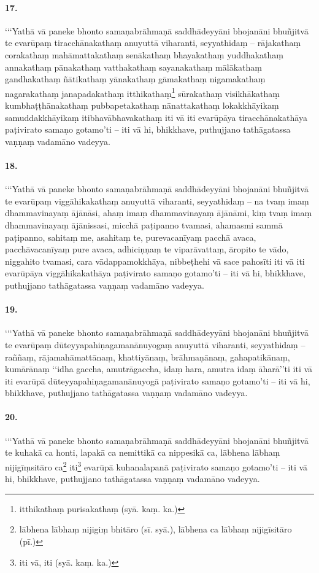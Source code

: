 \paragraph{17.}
‘‘‘Yathā vā paneke bhonto samaṇabrāhmaṇā saddhādeyyāni bhojanāni bhuñjitvā te evarūpaṃ tiracchānakathaṃ anuyuttā viharanti, seyyathidaṃ – rājakathaṃ corakathaṃ mahāmattakathaṃ senākathaṃ bhayakathaṃ yuddhakathaṃ annakathaṃ pānakathaṃ vatthakathaṃ sayanakathaṃ mālākathaṃ gandhakathaṃ ñātikathaṃ yānakathaṃ gāmakathaṃ nigamakathaṃ nagarakathaṃ janapadakathaṃ itthikathaṃ\footnote{itthikathaṃ purisakathaṃ (syā. kaṃ. ka.)} sūrakathaṃ visikhākathaṃ kumbhaṭṭhānakathaṃ pubbapetakathaṃ nānattakathaṃ lokakkhāyikaṃ samuddakkhāyikaṃ itibhavābhavakathaṃ iti vā iti evarūpāya tiracchānakathāya paṭivirato samaṇo gotamo’ti – iti vā hi, bhikkhave, puthujjano tathāgatassa vaṇṇaṃ vadamāno vadeyya.

\paragraph{18.}
‘‘‘Yathā vā paneke bhonto samaṇabrāhmaṇā saddhādeyyāni bhojanāni bhuñjitvā te evarūpaṃ viggāhikakathaṃ anuyuttā viharanti, seyyathidaṃ – na tvaṃ imaṃ dhammavinayaṃ ājānāsi, ahaṃ imaṃ dhammavinayaṃ ājānāmi, kiṃ tvaṃ imaṃ dhammavinayaṃ ājānissasi, micchā paṭipanno tvamasi, ahamasmi sammā paṭipanno, sahitaṃ me, asahitaṃ te, purevacanīyaṃ pacchā avaca, pacchāvacanīyaṃ pure avaca, adhiciṇṇaṃ te viparāvattaṃ, āropito te vādo, niggahito tvamasi, cara vādappamokkhāya, nibbeṭhehi vā sace pahosīti iti vā iti evarūpāya viggāhikakathāya paṭivirato samaṇo gotamo’ti – iti vā hi, bhikkhave, puthujjano tathāgatassa vaṇṇaṃ vadamāno vadeyya.
\paragraph{19.}
‘‘‘Yathā vā paneke bhonto samaṇabrāhmaṇā saddhādeyyāni bhojanāni bhuñjitvā te evarūpaṃ dūteyyapahiṇagamanānuyogaṃ anuyuttā viharanti, seyyathidaṃ – raññaṃ, rājamahāmattānaṃ, khattiyānaṃ, brāhmaṇānaṃ, gahapatikānaṃ, kumārānaṃ ‘‘idha gaccha, amutrāgaccha, idaṃ hara, amutra idaṃ āharā’’ti iti vā iti evarūpā dūteyyapahiṇagamanānuyogā paṭivirato samaṇo gotamo’ti – iti vā hi, bhikkhave, puthujjano tathāgatassa vaṇṇaṃ vadamāno vadeyya.

\paragraph{20.}
‘‘‘Yathā vā paneke bhonto samaṇabrāhmaṇā saddhādeyyāni bhojanāni bhuñjitvā te kuhakā ca honti, lapakā ca nemittikā ca nippesikā ca, lābhena lābhaṃ nijigīṃsitāro ca\footnote{lābhena lābhaṃ nijigiṃ bhitāro (sī. syā.), lābhena ca lābhaṃ nijigīsitāro (pī.)} iti\footnote{iti vā, iti (syā. kaṃ. ka.)} evarūpā kuhanalapanā paṭivirato samaṇo gotamo’ti – iti vā hi, bhikkhave, puthujjano tathāgatassa vaṇṇaṃ vadamāno vadeyya.

